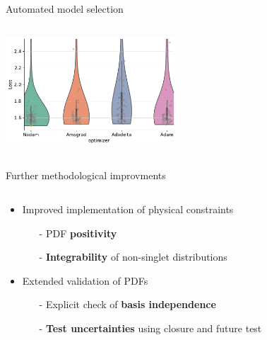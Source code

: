 \documentclass[aspectratio=169,9pt]{beamer}
\begin{document}
\begin{frame}[t]{Automated model selection}
\begin{columns}
\begin{column}{0.48\textwidth}
\begin{center}
                \includegraphics[width=0.48\textwidth]{sec_methodology_hyperopt_plot_optimizers.pdf}
            \end{center}
        \end{column}
    \end{columns}
\end{frame}


\begin{frame}[t]{Further methodological improvments}
    \begin{columns}[T]
        \begin{column}{0.48\textwidth}
            \begin{itemize}
                \item Improved implementation of physical constraints
                \begin{itemize}
                    \item[-] PDF \textbf{positivity}
                    \item[-] {\bfseries Integrability} of non-singlet distributions
                \end{itemize}
                \item Extended validation of PDFs
                \begin{itemize}
                    \item[-] Explicit check of {\bfseries basis independence}
                    \item[-] {\bfseries Test uncertainties} using closure and future test
                \end{itemize}

\end{itemize}
\end{column}
\end{columns}
\end{frame}
\end{document}
